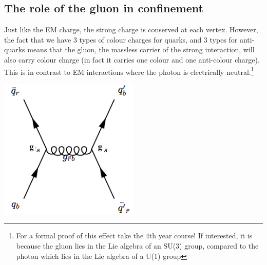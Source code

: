 \subsection{The role of the gluon in confinement}
Just like the EM charge, the strong charge is conserved at each vertex.
However, the fact that we have 3 types of colour charges for quarks, and 3 types
for anti-quarks means that the gluon, the massless carrier of the strong interaction, will also carry colour charge (in fact it carries one colour and one anti-colour charge). This is in contrast to EM interactions where the photon is electrically neutral.\footnote{For a formal proof of this effect take the 4th year course! If interested, it is because the gluon lies in the Lie algebra of an SU(3) group, compared to the photon which lies in the Lie algebra of a U(1) group}
\begin{center}
\includegraphics[width=0.5\textwidth]{fig/strongforce/gluon_qqbar.png}
\end{center}

